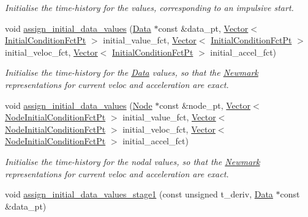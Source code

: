 \begin{DoxyCompactItemize}
\begin{DoxyCompactList}\small\item\em Initialise the time-\/history for the values, corresponding to an impulsive start. \end{DoxyCompactList}\item 
void \hyperlink{classoomph_1_1Newmark_ab5d5983bf3c821d738c429e24f157f05}{assign\+\_\+initial\+\_\+data\+\_\+values} (\hyperlink{classoomph_1_1Data}{Data} $\ast$const \&data\+\_\+pt, \hyperlink{classoomph_1_1Vector}{Vector}$<$ \hyperlink{classoomph_1_1Newmark_a40793f69efc56441a46296ad428dc3d4}{Initial\+Condition\+Fct\+Pt} $>$ initial\+\_\+value\+\_\+fct, \hyperlink{classoomph_1_1Vector}{Vector}$<$ \hyperlink{classoomph_1_1Newmark_a40793f69efc56441a46296ad428dc3d4}{Initial\+Condition\+Fct\+Pt} $>$ initial\+\_\+veloc\+\_\+fct, \hyperlink{classoomph_1_1Vector}{Vector}$<$ \hyperlink{classoomph_1_1Newmark_a40793f69efc56441a46296ad428dc3d4}{Initial\+Condition\+Fct\+Pt} $>$ initial\+\_\+accel\+\_\+fct)
\begin{DoxyCompactList}\small\item\em Initialise the time-\/history for the \hyperlink{classoomph_1_1Data}{Data} values, so that the \hyperlink{classoomph_1_1Newmark}{Newmark} representations for current veloc and acceleration are exact. \end{DoxyCompactList}\item 
void \hyperlink{classoomph_1_1Newmark_af5c92160bf14bf311e4bdab2016361f2}{assign\+\_\+initial\+\_\+data\+\_\+values} (\hyperlink{classoomph_1_1Node}{Node} $\ast$const \&node\+\_\+pt, \hyperlink{classoomph_1_1Vector}{Vector}$<$ \hyperlink{classoomph_1_1Newmark_af7c5c0d8127484525f751f084aa36d67}{Node\+Initial\+Condition\+Fct\+Pt} $>$ initial\+\_\+value\+\_\+fct, \hyperlink{classoomph_1_1Vector}{Vector}$<$ \hyperlink{classoomph_1_1Newmark_af7c5c0d8127484525f751f084aa36d67}{Node\+Initial\+Condition\+Fct\+Pt} $>$ initial\+\_\+veloc\+\_\+fct, \hyperlink{classoomph_1_1Vector}{Vector}$<$ \hyperlink{classoomph_1_1Newmark_af7c5c0d8127484525f751f084aa36d67}{Node\+Initial\+Condition\+Fct\+Pt} $>$ initial\+\_\+accel\+\_\+fct)
\begin{DoxyCompactList}\small\item\em Initialise the time-\/history for the nodal values, so that the \hyperlink{classoomph_1_1Newmark}{Newmark} representations for current veloc and acceleration are exact. \end{DoxyCompactList}\item 
void \hyperlink{classoomph_1_1Newmark_a520bb445dfb9f4418058ab1d40bd57ea}{assign\+\_\+initial\+\_\+data\+\_\+values\+\_\+stage1} (const unsigned t\+\_\+deriv, \hyperlink{classoomph_1_1Data}{Data} $\ast$const \&data\+\_\+pt)

\end{DoxyCompactItemize}
